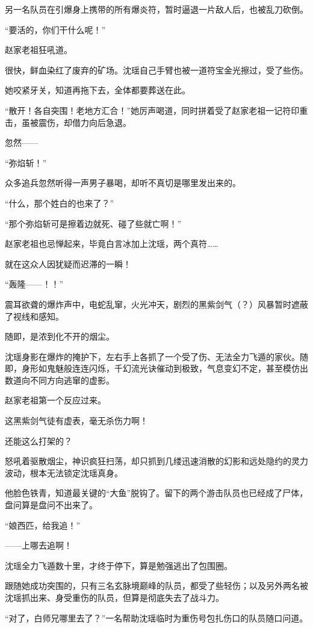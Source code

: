 另一名队员在引爆身上携带的所有爆炎符，暂时逼退一片敌人后，也被乱刀砍倒。

“要活的，你们干什么呢！”

赵家老祖狂吼道。

很快，鲜血染红了废弃的矿场。沈瑶自己手臂也被一道符宝金光擦过，受了些伤。

她咬紧牙关，知道再拖下去，全体都要葬送在此。

“散开！各自突围！老地方汇合！”她厉声喝道，同时拼着受了赵家老祖一记符印重击，虽被震伤，却借力向后急退。

忽然——

“弥焰斩！”

众多追兵忽然听得一声男子暴喝，却听不真切是哪里发出来的。

“什么，那个姓白的也来了？”

“那个弥焰斩可是擦着边就死、碰了些就亡啊！”

赵家老祖也忌惮起来，毕竟白言冰加上沈瑶，两个真符……

就在这众人因犹疑而迟滞的一瞬！

“轰隆——！！”

震耳欲聋的爆炸声中，电蛇乱窜，火光冲天，剧烈的黑紫剑气（？）风暴暂时遮蔽了视线和感知。

随即，是浓到化不开的烟尘。

沈瑶身影在爆炸的掩护下，左右手上各抓了一个受了伤、无法全力飞遁的家伙。随即，身形如鬼魅般连连闪烁，千幻流光诀催动到极致，气息变幻不定，甚至模仿出数道向不同方向逃窜的虚影。

赵家老祖第一个反应过来。

这黑紫剑气徒有虚表，毫无杀伤力啊！

还能这么打架的？

怒吼着驱散烟尘，神识疯狂扫荡，却只抓到几缕迅速消散的幻影和远处隐约的灵力波动，根本无法锁定沈瑶真身。

他脸色铁青，知道最关键的“大鱼”脱钩了。留下的两个游击队员也已经成了尸体，盘问算是盘问不出来了。

“娘西匹，给我追！”

——上哪去追啊！

\vspace{2em}

沈瑶全力飞遁数十里，才终于停下，算是勉强逃出了包围圈。

跟随她成功突围的，只有三名玄脉境巅峰的队员，都受了些轻伤；以及另外两名被沈瑶抓出来、身受重伤的队员，但算是彻底失去了战斗力。

“对了，白师兄哪里去了？”一名帮助沈瑶临时为重伤号包扎伤口的队员随口问道。


